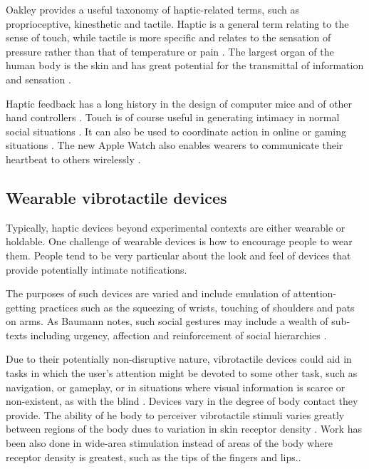 \documentclass[a4paper, twocolumn]{article}
\begin{document}
Oakley provides a useful taxonomy of haptic-related terms, such as proprioceptive, kinesthetic and tactile. Haptic is a general term relating to the sense of touch, while tactile is more specific and relates to the sensation of pressure rather than that of temperature or pain \cite{oakley2000putting}. The largest organ of the human body is the skin and has great potential for the transmittal of information and sensation \cite{lindeman2006wearable} \cite{brewster2004tactons}. 

Haptic feedback has a long history in the design of computer mice and of other hand controllers \cite{yang2005novel}. Touch is of course useful in generating intimacy in normal social situations \cite{bronner1982haptic}. It can also be used to coordinate action in online or gaming situations \cite{ho1998experiment}. The new Apple Watch also enables wearers to communicate their heartbeat to others wirelessly \cite{johnson2014literature}. 

\subsection{Wearable vibrotactile devices}
Typically, haptic devices beyond experimental contexts are either wearable or holdable. One challenge of wearable devices is how to encourage people to wear them. People tend to be very particular about the look and feel of devices that provide potentially intimate notifications. 

The purposes of such devices are varied and include emulation of attention-getting practices such as the squeezing of wrists, touching of shoulders and pats on arms. As Baumann notes, such social gestures may include a wealth of sub-texts including urgency, affection and reinforcement of social hierarchies \cite{baumann2010emulating}.

Due to their potentially non-disruptive nature, vibrotactile devices could aid in tasks in which the user's attention might be devoted to some other task, such as navigation, or gameplay, or in situations where visual information is scarce or non-existent, as with the blind \cite{ertan1998wearable}.  Devices vary in the degree of body contact they provide. The ability of he body to perceiver vibrotactile stimuli varies greatly between regions of the body dues to variation in skin receptor density \cite{lindeman2006wearable}. Work has been also done in wide-area stimulation instead of areas of the body where receptor density is greatest, such as the tips of the fingers and lips.\cite{lindeman2004towards}.
\end{document}
